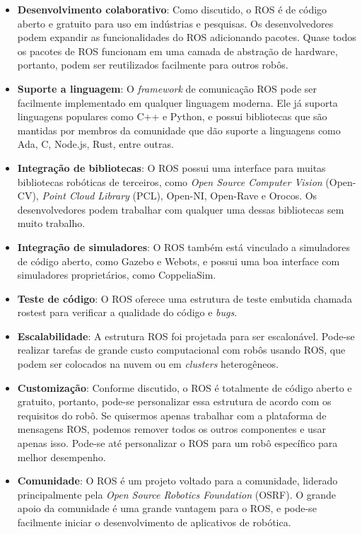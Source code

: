 \begin{itemize}
    \item \textbf{Desenvolvimento colaborativo}: Como discutido, o ROS é de código aberto e gratuito para uso em indústrias e pesquisas. Os desenvolvedores podem expandir as funcionalidades do ROS adicionando pacotes. Quase todos os pacotes de ROS funcionam em uma camada de abstração de hardware, portanto, podem ser reutilizados facilmente para outros robôs.
    
    \item \textbf{Suporte a linguagem}: O \textit{framework} de comunicação ROS pode ser facilmente implementado em qualquer linguagem moderna. Ele já suporta linguagens populares como C++ e Python, e possui bibliotecas que são mantidas por membros da comunidade que dão suporte a linguagens como Ada, C, Node.js, Rust, entre outras.
    
    \item \textbf{Integração de bibliotecas}: O ROS possui uma interface para muitas bibliotecas robóticas de terceiros, como \textit{Open Source Computer Vision} (Open-CV), \textit{Point Cloud Library} (PCL), Open-NI, Open-Rave e Orocos. Os desenvolvedores podem trabalhar com qualquer uma dessas bibliotecas sem muito trabalho.
    
    \item \textbf{Integração de simuladores}: O ROS também está vinculado a simuladores de código aberto, como Gazebo e Webots, e possui uma boa interface com simuladores proprietários, como CoppeliaSim.
    
    \item \textbf{Teste de código}: O ROS oferece uma estrutura de teste embutida chamada rostest para verificar a qualidade do código e \textit{bugs}.
    
    \item \textbf{Escalabilidade}: A estrutura ROS foi projetada para ser escalonável. Pode-se realizar tarefas de grande custo computacional com robôs usando ROS, que podem ser colocados na nuvem ou em \textit{clusters} heterogêneos.
    
    \item \textbf{Customização}: Conforme discutido, o ROS é totalmente de código aberto e gratuito, portanto, pode-se personalizar essa estrutura de acordo com os requisitos do robô. Se quisermos apenas trabalhar com a plataforma de mensagens ROS, podemos remover todos os outros componentes e usar apenas isso. Pode-se até personalizar o ROS para um robô específico para melhor desempenho.
    
    \item \textbf{Comunidade}: O ROS é um projeto voltado para a comunidade, liderado principalmente pela \textit{Open Source Robotics Foundation} (OSRF). O grande apoio da comunidade é uma grande vantagem para o ROS, e pode-se facilmente iniciar o desenvolvimento de aplicativos de robótica.
\end{itemize}

